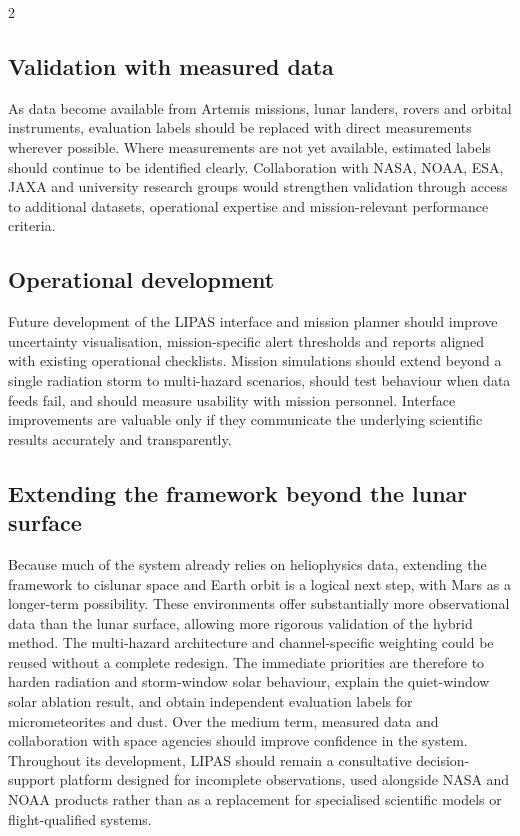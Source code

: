 \begin{multicols}{2}
\subsection{Validation with measured data}

As data become available from Artemis missions, lunar landers, rovers and orbital instruments, evaluation labels should be replaced with direct measurements wherever possible. Where measurements are not yet available, estimated labels should continue to be identified clearly. Collaboration with NASA, NOAA, ESA, JAXA and university research groups would strengthen validation through access to additional datasets, operational expertise and mission-relevant performance criteria.

\subsection{Operational development}

Future development of the LIPAS interface and mission planner should improve uncertainty visualisation, mission-specific alert thresholds and reports aligned with existing operational checklists. Mission simulations should extend beyond a single radiation storm to multi-hazard scenarios, should test behaviour when data feeds fail, and should measure usability with mission personnel. Interface improvements are valuable only if they communicate the underlying scientific results accurately and transparently.

\subsection{Extending the framework beyond the lunar surface}

Because much of the system already relies on heliophysics data, extending the framework to cislunar space and Earth orbit is a logical next step, with Mars as a longer-term possibility. These environments offer substantially more observational data than the lunar surface, allowing more rigorous validation of the hybrid method. The multi-hazard architecture and channel-specific weighting could be reused without a complete redesign. The immediate priorities are therefore to harden radiation and storm-window solar behaviour, explain the quiet-window solar ablation result, and obtain independent evaluation labels for micrometeorites and dust. Over the medium term, measured data and collaboration with space agencies should improve confidence in the system. Throughout its development, LIPAS should remain a consultative decision-support platform designed for incomplete observations, used alongside NASA and NOAA products rather than as a replacement for specialised scientific models or flight-qualified systems.
\end{multicols}

